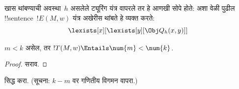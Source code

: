 \documentclass[../../../include/open-logic-section]{subfiles}
\begin{document}
खास थांबण्याची अवस्था~$h$
असलेले ट्यूरिंग यंत्र
वापरले तर हे आणखी सोपे
होते: अशा वेळी पुढील
!!{sentence}~$!E(M, w)$
यंत्र अखेरीस थांबते हे
व्यक्त करते:
\[
\lexists[x][\lexists[y][\Obj Q_h(x, y)]]
\]

\begin{prop}
$m < k$ असेल, तर
$!T(M, w) \Entails \num{m} < \num{k}$.
\end{prop}

\begin{proof}
सराव.
\end{proof}

\begin{prob}
सिद्ध करा. (सूचना: $k-m$
वर गणितीय विगमन वापरा.)
\end{prob}
\end{document}
